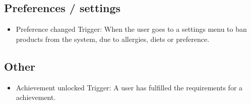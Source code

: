 \subsection{Preferences / settings}
\begin{itemize}
\item Preference changed
	\subitem Trigger: When the user goes to a settings menu to ban products from the system, due to allergies, diets or preference.
\end{itemize}


\subsection{Other}
\begin{itemize}
\item Achievement unlocked
	\subitem Trigger: A user has fulfilled the requirements for a achievement.
\end{itemize}

